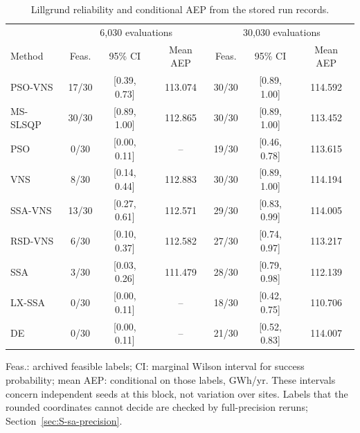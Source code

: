 \begin{table}[!htbp]
\centering
\caption{Lillgrund reliability and conditional AEP from the stored run records.}
\label{tab:archive-reliability}
\small\setlength{\tabcolsep}{4pt}
\begin{tabular}{lcccccc}
\toprule
& \multicolumn{3}{c}{6,030 evaluations} & \multicolumn{3}{c}{30,030 evaluations} \\
Method & Feas. & 95\% CI & Mean AEP & Feas. & 95\% CI & Mean AEP \\
\midrule
PSO-VNS & 17/30 & [0.39, 0.73] & 113.074 & 30/30 & [0.89, 1.00] & 114.592 \\
MS-SLSQP & 30/30 & [0.89, 1.00] & 112.865 & 30/30 & [0.89, 1.00] & 113.452 \\
PSO & 0/30 & [0.00, 0.11] & -- & 19/30 & [0.46, 0.78] & 113.615 \\
VNS & 8/30 & [0.14, 0.44] & 112.883 & 30/30 & [0.89, 1.00] & 114.194 \\
SSA-VNS & 13/30 & [0.27, 0.61] & 112.571 & 29/30 & [0.83, 0.99] & 114.005 \\
RSD-VNS & 6/30 & [0.10, 0.37] & 112.582 & 27/30 & [0.74, 0.97] & 113.217 \\
SSA & 3/30 & [0.03, 0.26] & 111.479 & 28/30 & [0.79, 0.98] & 112.139 \\
LX-SSA & 0/30 & [0.00, 0.11] & -- & 18/30 & [0.42, 0.75] & 110.706 \\
DE & 0/30 & [0.00, 0.11] & -- & 21/30 & [0.52, 0.83] & 114.007 \\
\bottomrule
\end{tabular}
\par\smallskip\parbox{\textwidth}{\footnotesize Feas.: archived feasible labels; CI: marginal Wilson interval for success probability; mean AEP: conditional on those labels, GWh/yr. These intervals concern independent seeds at this block, not variation over sites. Labels that the rounded coordinates cannot decide are checked by full-precision reruns; Section~\ref{sec:S-sa-precision}.}
\end{table}
